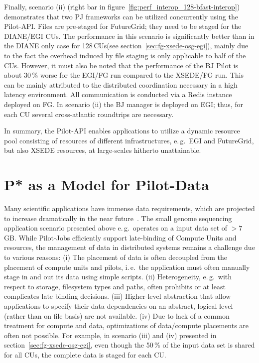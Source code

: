 \documentclass[conference,final]{IEEEtran}
\newcommand{\jhanote}[1]{ {\textcolor{red} { ***shantenu: #1 }}}
\newcommand{\alnote}[1]{ {\textcolor{blue} { ***andreL: #1 }}}
\newcommand{\alnote}[1]{}
\newcommand{\jhanote}[1]{}
\newcommand{\pilot}{Pilot\xspace}
\newcommand{\computeunits}{Compute Units\xspace}
\newcommand{\cu}{CU\xspace}
\newcommand{\cus}{CUs\xspace}
\newcommand{\upp}{\vspace*{-0.5em}}
\begin{document}

Finally, scenario (ii) (right bar in
figure~\ref{fig:perf_interop_128-bfast-interop}) demonstrates that two PJ
frameworks can be utilized concurrently using the Pilot-API. Files are
pre-staged for FutureGrid; they need to be staged for the DIANE/EGI \cus. The
performance in this scenario is significantly better than in the DIANE only case
for 128\,\cus (see section~\ref{sec:fg-xsede-osg-egi}), mainly due to the fact
the overhead induced by file staging is only applicable to half of the \cus.
However, it must also be noted that the performance of the BJ \pilot is about
30\,\% worse for the EGI/FG run compared to the XSEDE/FG run. This can be mainly
attributed to the distributed coordination necessary in a high latency
environment. All communication is conducted via a Redis instance deployed on FG.
In scenario (ii) the BJ manager is deployed on EGI; thus, for each \cu several
cross-atlantic roundtrips are necessary.

In summary, the Pilot-API enables applications to utilize a dynamic
resource pool consisting of resources of different infrastructures, e.\,g.\ EGI
and FutureGrid, but also XSEDE resources, at large-scales hitherto unattainable.



\section{P* as a Model for Pilot-Data\upp\upp}
\label{sec:pilot-data}

Many scientific applications have immense data requirements, which are
projected to increase dramatically in the near
future~\cite{hey2009}. The small genome sequencing application
scenario presented above e.\,g.\ operates on a input data set of
$>7$\,GB. While Pilot-Jobs efficiently support late-binding of
\computeunits and resources, the management of data in distributed
systems remains a challenge due to various reasons: (i) The placement
of data is often decoupled from the placement of compute units and
pilots, i.\,e.\ the application must often manually stage in and out
its data using simple scripts.  (ii) Heterogeneity, e.\,g.\ with
respect to storage, filesystem types and paths, often prohibits or at
least complicates late binding decisions. (iii) Higher-level
abstraction that allow applications to specify their data dependencies
on an abstract, logical level (rather than on file basis) are not
available. (iv) Due to lack of a common treatment for compute and
data, optimizations of data/compute placements are often not
possible. For example, in scenario (iii) and (iv) presented in
section~\ref{sec:fg-xsede-osg-egi}, even though the 50\,\% of the
input data set is shared for all \cus, the complete data is staged for
each \cu.
\end{document}
